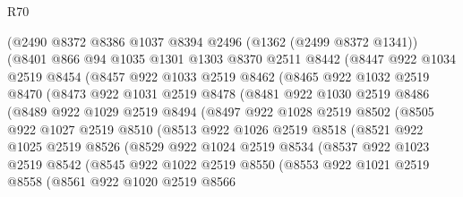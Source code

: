 \begin{lexlean}{R70}
\begin{coremodule}
      (@2490
        @8372
        @8386
        @1037
        @8394
        @2496
        (@1362 (@2499 @8372 @1341))
        (@8401
          @866
          @94
          @1035
          @1301
          @1303
          @8370
          @2511
          @8442
          (@8447
            @922
            @1034
            @2519
            @8454
            (@8457
              @922
              @1033
              @2519
              @8462
              (@8465
                @922
                @1032
                @2519
                @8470
                (@8473
                  @922
                  @1031
                  @2519
                  @8478
                  (@8481
                    @922
                    @1030
                    @2519
                    @8486
                    (@8489
                      @922
                      @1029
                      @2519
                      @8494
                      (@8497
                        @922
                        @1028
                        @2519
                        @8502
                        (@8505
                          @922
                          @1027
                          @2519
                          @8510
                          (@8513
                            @922
                            @1026
                            @2519
                            @8518
                            (@8521
                              @922
                              @1025
                              @2519
                              @8526
                              (@8529
                                @922
                                @1024
                                @2519
                                @8534
                                (@8537
                                  @922
                                  @1023
                                  @2519
                                  @8542
                                  (@8545
                                    @922
                                    @1022
                                    @2519
                                    @8550
                                    (@8553
                                      @922
                                      @1021
                                      @2519
                                      @8558
                                      (@8561
                                        @922
                                        @1020
                                        @2519
                                        @8566

\end{coremodule}
\end{lexlean}
